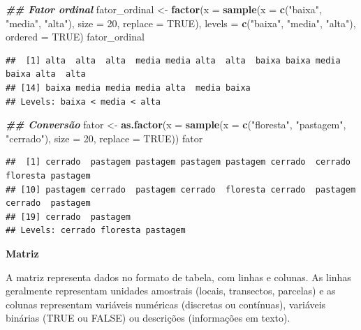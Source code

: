 \documentclass[
]{article}
\newenvironment{Shaded}{\begin{snugshade}}{\end{snugshade}}
\newcommand{\AttributeTok}[1]{\textcolor[rgb]{0.13,0.29,0.53}{#1}}
\newcommand{\ConstantTok}[1]{\textcolor[rgb]{0.56,0.35,0.01}{#1}}
\newcommand{\DecValTok}[1]{\textcolor[rgb]{0.00,0.00,0.81}{#1}}
\newcommand{\DocumentationTok}[1]{\textcolor[rgb]{0.56,0.35,0.01}{\textbf{\textit{#1}}}}
\newcommand{\FunctionTok}[1]{\textcolor[rgb]{0.13,0.29,0.53}{\textbf{#1}}}
\newcommand{\NormalTok}[1]{#1}
\newcommand{\OtherTok}[1]{\textcolor[rgb]{0.56,0.35,0.01}{#1}}
\newcommand{\StringTok}[1]{\textcolor[rgb]{0.31,0.60,0.02}{#1}}
\begin{document}
\begin{Shaded}
\begin{Highlighting}[]
\DocumentationTok{\#\# Fator ordinal}
\NormalTok{fator\_ordinal }\OtherTok{\textless{}{-}} \FunctionTok{factor}\NormalTok{(}\AttributeTok{x =} \FunctionTok{sample}\NormalTok{(}\AttributeTok{x =} \FunctionTok{c}\NormalTok{(}\StringTok{"baixa"}\NormalTok{, }\StringTok{"media"}\NormalTok{, }\StringTok{"alta"}\NormalTok{), }
                                   \AttributeTok{size =} \DecValTok{20}\NormalTok{, }\AttributeTok{replace =} \ConstantTok{TRUE}\NormalTok{),}
                        \AttributeTok{levels =} \FunctionTok{c}\NormalTok{(}\StringTok{"baixa"}\NormalTok{, }\StringTok{"media"}\NormalTok{, }\StringTok{"alta"}\NormalTok{), }\AttributeTok{ordered =} \ConstantTok{TRUE}\NormalTok{)}
\NormalTok{fator\_ordinal}
\end{Highlighting}
\end{Shaded}

\begin{verbatim}
##  [1] alta  alta  alta  media media alta  alta  baixa baixa media baixa alta  alta 
## [14] baixa media media media alta  media baixa
## Levels: baixa < media < alta
\end{verbatim}

\begin{Shaded}
\begin{Highlighting}[]
\DocumentationTok{\#\# Conversão}
\NormalTok{fator }\OtherTok{\textless{}{-}} \FunctionTok{as.factor}\NormalTok{(}\AttributeTok{x =} \FunctionTok{sample}\NormalTok{(}\AttributeTok{x =} \FunctionTok{c}\NormalTok{(}\StringTok{"floresta"}\NormalTok{, }\StringTok{"pastagem"}\NormalTok{, }\StringTok{"cerrado"}\NormalTok{), }
                              \AttributeTok{size =} \DecValTok{20}\NormalTok{, }\AttributeTok{replace =} \ConstantTok{TRUE}\NormalTok{))}
\NormalTok{fator}
\end{Highlighting}
\end{Shaded}

\begin{verbatim}
##  [1] cerrado  pastagem pastagem pastagem pastagem cerrado  cerrado  floresta pastagem
## [10] pastagem cerrado  pastagem cerrado  floresta cerrado  pastagem cerrado  pastagem
## [19] cerrado  pastagem
## Levels: cerrado floresta pastagem
\end{verbatim}

\textbf{Matriz}

A matriz representa dados no formato de tabela, com linhas e colunas. As linhas geralmente representam unidades amostrais (locais, transectos, parcelas) e as colunas representam variáveis numéricas (discretas ou contínuas), variáveis binárias (TRUE ou FALSE) ou descrições (informações em texto).
\end{document}
